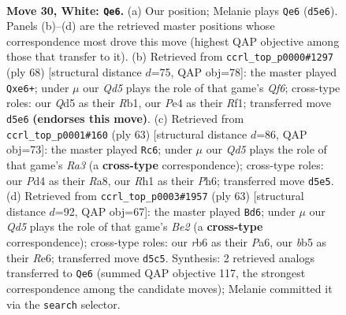 \documentclass[11pt]{article}
\begin{document}
\clearpage

\begin{figure}[p]\centering
\begin{subfigure}{0.46\textwidth}\centering
\resizebox{\linewidth}{!}{%
\newchessgame
\chessboard[
  setfen={1k1r4/1p2p1bn/1r1p4/1b1Q2p1/3PP3/1PR2P2/6PP/1K5R w - - 4 30},
  showmover=false,
  pgfstyle=straightmove, color=movearrow, markmove={d5-e6}
]}
\caption{}
\end{subfigure}\hfill
\begin{subfigure}{0.46\textwidth}\centering
\resizebox{\linewidth}{!}{%
\newchessgame
\chessboard[
  setfen={1r4k1/3r3p/1b2pQp1/p2pP3/5P1P/2q5/6PK/1R3R2 w - - 2 35},
  showmover=false,
  pgfstyle=straightmove, color=movearrow, markmove={f6-e6}
]}
\caption{}
\end{subfigure}
\\[4pt]
\begin{subfigure}{0.46\textwidth}\centering
\resizebox{\linewidth}{!}{%
\newchessgame
\chessboard[
  setfen={r7/6pk/r4p1p/4pP2/Pp1q4/1Q1P3P/5PP1/R1R3K1 b - - 0 32},
  showmover=false,
  pgfstyle=straightmove, color=movearrow, markmove={a6-c6}
]}
\caption{}
\end{subfigure}\hfill
\begin{subfigure}{0.46\textwidth}\centering
\resizebox{\linewidth}{!}{%
\newchessgame
\chessboard[
  setfen={4r3/4b1k1/p1q1rpp1/1pP4p/3B4/PQ1R3P/5PP1/2R3K1 b - - 3 32},
  showmover=false,
  pgfstyle=straightmove, color=movearrow, markmove={e7-d6}
]}
\caption{}
\end{subfigure}
\caption{\textbf{Move 30, White: \texttt{Qe6}.} (a) Our position; Melanie plays \texttt{Qe6} (\texttt{d5e6}). Panels (b)--(d) are the retrieved master positions whose correspondence most drove this move (highest QAP objective among those that transfer to it). (b) Retrieved from \texttt{ccrl\_top\_p0000\#1297} (ply 68) [structural distance $d$=75, QAP obj=78]: the master played \texttt{Qxe6+}; under $\mu$ our \emph{Qd5} plays the role of that game's \emph{Qf6}; cross-type roles: our \emph{Q}d5 as their \emph{R}b1, our \emph{P}e4 as their \emph{R}f1; transferred move \texttt{d5e6} \textbf{(endorses this move)}. (c) Retrieved from \texttt{ccrl\_top\_p0001\#160} (ply 63) [structural distance $d$=86, QAP obj=73]: the master played \texttt{Rc6}; under $\mu$ our \emph{Qd5} plays the role of that game's \emph{Ra3} (a \textbf{cross-type} correspondence); cross-type roles: our \emph{P}d4 as their \emph{R}a8, our \emph{R}h1 as their \emph{P}h6; transferred move \texttt{d5e5}. (d) Retrieved from \texttt{ccrl\_top\_p0003\#1957} (ply 63) [structural distance $d$=92, QAP obj=67]: the master played \texttt{Bd6}; under $\mu$ our \emph{Qd5} plays the role of that game's \emph{Be2} (a \textbf{cross-type} correspondence); cross-type roles: our \emph{r}b6 as their \emph{P}a6, our \emph{b}b5 as their \emph{R}e6; transferred move \texttt{d5c5}. Synthesis: 2 retrieved analogs transferred to \texttt{Qe6} (summed QAP objective 117, the strongest correspondence among the candidate moves); Melanie committed it via the \texttt{search} selector.}
\label{fig:thought-m58}
\end{figure}
\end{document}
